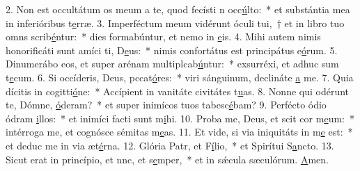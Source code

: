 2. Non est occultátum os meum a te, quod fecísti n occ\uline{ú}lto:~* et substántia mea in inferióribus t\uline{e}rræ.
3. Imperféctum meum vidérunt óculi tui,~† et in libro tuo omns scrib\uline{é}ntur:~* dies formabúntur, et nemo in \uline{e}is.
4. Mihi autem nimis honorificáti sunt amíci ti, D\uline{e}us:~* nimis confortátus est principátus e\uline{ó}rum.
5. Dinumerábo eos, et super arénam multiplcab\uline{ú}ntur:~* exsurréxi, et adhuc sum t\uline{e}cum.
6. Si occíderis, Deus, pccat\uline{ó}res:~* viri sánguinum, declináte \uline{a} me.
7. Quia dícitis in cogitti\uline{ó}ne:~* Accípient in vanitáte civitátes t\uline{u}as.
8. Nonne qui odérunt te, Dómne, \uline{ó}deram?~* et super inimícos tuos tabesc\uline{é}bam?
9. Perfécto ódio ódram \uline{i}llos:~* et inimíci facti sunt m\uline{i}hi.
10. Proba me, Deus, et scit cor m\uline{e}um:~* intérroga me, et cognósce sémitas m\uline{e}as.
11. Et vide, si via iniquitáts in m\uline{e} est:~* et deduc me in via æt\uline{é}rna.
12. Glória Patr, et F\uline{í}lio,~* et Spirítui S\uline{a}ncto.
13. Sicut erat in princípio, et nnc, et s\uline{e}mper,~* et in sǽcula sæculórum. \uline{A}men.
